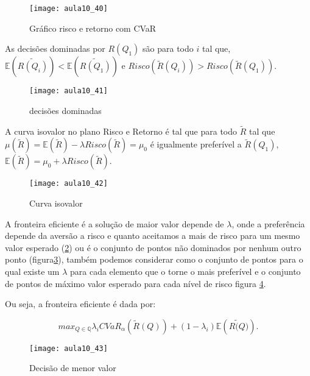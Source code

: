 \begin{figure}[H]
\begin{centering}
\texttt{[image: aula10\_40]}\protect\caption{\label{fig:aula10_40} Gráfico risco e retorno com CVaR}
\end{centering}
\end{figure}


As decisões dominadas por $R(Q_{1})$ são para todo $i$ tal que, $\mathbb{E}(\tilde{R(Q_{i})})<\mathbb{E}(\tilde{R(Q_{1})})$ e $Risco(\tilde{R}(Q_{i}))>Risco(\tilde{R}(Q_{1}))$.

\begin{figure}[H]
\begin{centering}
\texttt{[image: aula10\_41]}\protect\caption{\label{fig:aula10_41} decisões dominadas}
\end{centering}
\end{figure}


A curva isovalor no plano Risco e Retorno é tal que para todo $\tilde{R}$ tal que $\mu(\tilde{R})=\mathbb{E}(\tilde{R})-\lambda Risco(\tilde{R})=\mu_{0}$
é igualmente preferível a $\tilde{R}(Q_{1})$,$\mathbb{E}(\tilde{R})=\mu_{0}+\lambda Risco(\tilde{R})$.

\begin{figure}[H]
\begin{centering}
\texttt{[image: aula10\_42]}\protect\caption{\label{fig:aula10_42} Curva isovalor}
\end{centering}
\end{figure}


 A fronteira eficiente é a solução de maior valor depende de $\lambda$, onde a preferência depende da aversão a risco e quanto aceitamos a mais de risco para um mesmo valor esperado (\ref{fig:aula10_41}) ou é o conjunto de pontos não dominados por nenhum outro ponto  (figura\ref{fig:aula10_42}), também podemos considerar como o conjunto de pontos para o qual existe um $\lambda$ para cada elemento que o torne o mais preferível e o conjunto de pontos de máximo valor esperado para cada nível de risco figura \ref{fig:aula10_43}.

Ou seja, a fronteira eficiente é dada por: 

$$max_{Q\in\mathbb{Q}}\lambda_{i}CVaR_{\alpha}\left(\tilde{R}(Q)\right)+(1-\lambda_{i})\mathbb{E}\left(\tilde{R(Q})\right).$$

\begin{figure}[H]
\begin{centering}
\texttt{[image: aula10\_43]}\protect\caption{\label{fig:aula10_43} Decisão de menor valor }
\end{centering}
\end{figure}

